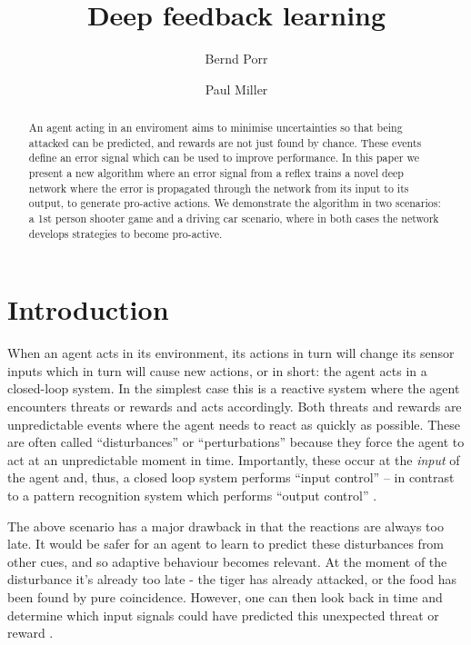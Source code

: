 \documentclass{llncs}
\title{Deep feedback learning}
\author{Bernd Porr \and Paul Miller}
\institute{Glasgow Neuro LTD, United Kingdom\\
  \email{bernd@glasgowneuro.tech}\\
  \email{paul@glasgowneuro.tech}}
\begin{document}
\maketitle

\begin{abstract}
  An agent acting in an enviroment aims to minimise uncertainties so
  that being attacked can be predicted, and rewards are not just
  found by chance. These events define an error signal which can be used to
  improve performance. In this paper we present a new algorithm where an
  error signal from a reflex trains a novel deep network where the error is
  propagated through the network from its input to its output, to generate pro-active
  actions. We demonstrate the algorithm in two scenarios: a 1st person
  shooter game and a driving car scenario, where in both cases the network
  develops strategies to become pro-active.
\end{abstract}

\section{Introduction}
When an agent acts in its environment, its actions in turn will
change its sensor inputs which in turn will cause new actions, or in
short: the agent acts in a closed-loop system. In the simplest case this
is a reactive system where the agent encounters threats or rewards and
acts accordingly. Both threats and rewards are unpredictable events
where the agent needs to react as quickly as possible. These are often 
called ``disturbances'' or ``perturbations'' because they force
the agent to act at an unpredictable moment in time. Importantly, these
occur at the \textsl{input} of the agent and, thus, a closed loop system
performs ``input control'' -- in contrast to a pattern recognition system
which performs ``output control'' \cite{Phillips2000}.

The above scenario has a major drawback in that the reactions are always
too late.  It would be safer for an agent to learn to predict these
disturbances from other cues, and so adaptive behaviour becomes
relevant. At the moment of the disturbance it's already too late - the
tiger has already attacked, or the food has been found by pure
coincidence. However, one can then look back in time and determine
which input signals could have predicted this unexpected
threat or reward \cite{Sutton98,Woergoetter2005,PorrNecoInvco2003}.
\end{document}
